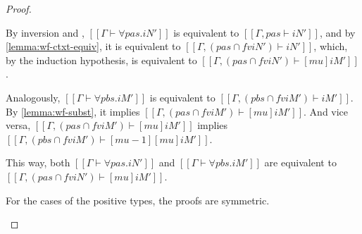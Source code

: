 \begin{proof}
\begin{caseof}
      By inversion and ,
      $[[Γ ⊢ ∀pas.iN']]$ is equivalent to $[[Γ, pas ⊢ iN']]$,
      and by \cref{lemma:wf-ctxt-equiv}, it is equivalent to 
      $[[Γ,  ({pas} ∩ fv iN') ⊢ iN']]$,
      which, by the induction hypothesis, is equivalent to
      $[[Γ,  ({pas} ∩ fv iN') ⊢ [mu]iM']]$.

      Analogously, $[[Γ ⊢ ∀pbs.iM']]$ is equivalent to
      $[[Γ, ( {pbs} ∩ fv iM') ⊢ iM']]$.
      By \cref{lemma:wf-subst}, it implies 
      $[[Γ,  ({pas} ∩ fv iM') ⊢ [mu]iM']]$. And vice versa, 
      $[[Γ,  ({pas} ∩ fv iM') ⊢ [mu]iM']]$ implies  
      $[[Γ,  ({pbs} ∩ fv iM') ⊢ [mu-1][mu]iM']]$.
 
      This way, both $[[Γ ⊢ ∀pas.iN']]$ and $[[Γ ⊢ ∀pbs.iM']]$ are equivalent to
      $[[Γ,  ({pas} ∩ fv iN') ⊢ [mu]iM']]$. 
    \item For the cases of the positive types, the proofs are symmetric.
  \end{caseof}
\end{proof}

